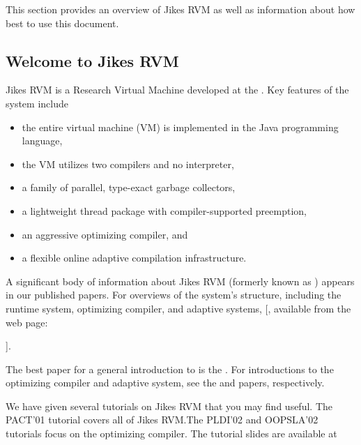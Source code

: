 This section provides an overview of Jikes\TMweb{} RVM as well as
information about how best to use this document.

\subsection{Welcome to Jikes RVM}

Jikes\TMboth{} RVM is a Research Virtual Machine 
 developed at the 
\Rboth{}
.  Key
features of the system include
\begin{itemize}
\item the entire virtual machine (VM) is implemented in the
  Java\TMboth{} programming language,
\item the VM utilizes two compilers and no interpreter,
\item a family of parallel, type-exact garbage collectors,
\item a lightweight thread package with compiler-supported preemption,
\item an aggressive optimizing compiler, and 
\item a flexible online adaptive compilation infrastructure.
\end{itemize}

A significant body of information about Jikes RVM 
(formerly known as 
\xlink{\jp}{\JalapenoHomeURL}) appears 
in our published
papers.  For overviews of the system's structure, including the runtime system,
optimizing compiler, and adaptive systems, [, available from the \jrvm{} web page:
\begin{quote}
\texttt{\RVMPubsURL}
\end{quote}
]{\RVMPubsURL}.

The best paper for a general introduction to \jrvm{} is the 
.  
For introductions to the
optimizing compiler and adaptive system, see the 
{\JavaGrandePaperURL}
 and 
{\tt \OOPSLAPaperURL}  
papers, respectively.

We have given several tutorials on Jikes RVM that you may find
useful. The PACT'01 tutorial covers all of Jikes RVM.\@  The PLDI'02 and
OOPSLA'02 tutorials focus on the optimizing compiler.  The tutorial
slides are available at
\begin{quote}
\xlink{{\tt \RVMSlidesURL}}{\RVMSlidesURL}
\end{quote}


